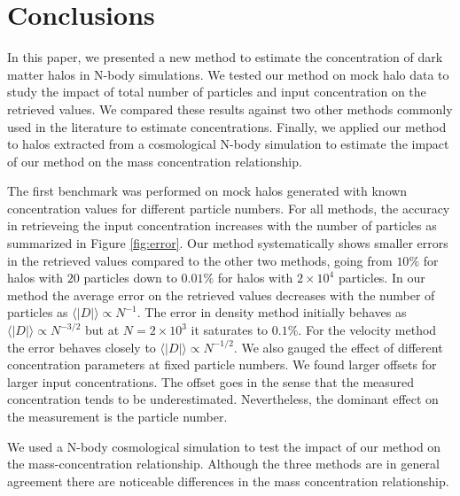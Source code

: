 \documentclass[a4,useAMS,usenatbib,usegraphicx]{mn2e}
\begin{document}
\section{Conclusions}
\label{sec:conclusions}

In this paper, we presented a new method to estimate the
concentration of dark matter halos in N-body simulations. 
We tested our method on mock halo data to study the impact of total
number of particles and input concentration on the retrieved values.
We compared these results against two other methods commonly used in
the literature to estimate concentrations.
Finally, we applied our method to halos extracted from a cosmological
N-body simulation to estimate the impact of our method on the mass
concentration relationship. 


The first benchmark was performed on mock halos generated with known
concentration values for different particle numbers. 
For all methods, the accuracy in retrieveing the input concentration
increases with the number of particles as summarized in Figure \ref{fig:error}.
Our method systematically shows smaller errors in the retrieved values
compared to the other two methods, going from $10\%$ for halos with
$20$ particles down to $0.01\%$ for halos with $2\times 10^4$ particles. 
In our method the average error on the retrieved values decreases with
the number of particles as $\langle|D|\rangle\propto N^{-1}$.
The error in density method initially behaves as $\langle|D|\rangle\propto
N^{-3/2}$ but at $N=2\times 10^3$ it saturates to $0.1\%$. 
For the velocity method the error behaves closely to
$\langle|D|\rangle\propto N^{-1/2}$.
We also gauged the effect of different concentration parameters at
fixed particle numbers. 
We found larger offsets for larger input concentrations. 
The offset goes in the sense that the measured concentration tends to
be underestimated.
Nevertheless, the dominant effect on the measurement is the particle
number.

We used a N-body cosmological simulation to test the impact of our
method on the mass-concentration relationship.
Although the three methods are in general agreement there are
noticeable differences in the mass concentration relationship.





\end{document}
